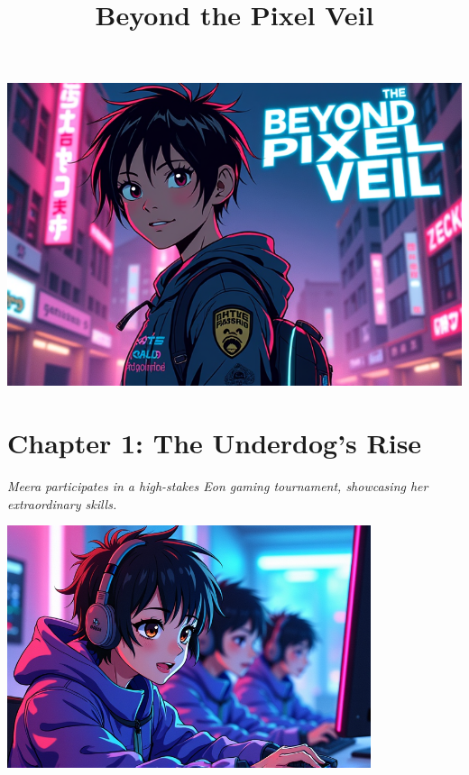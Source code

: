 \documentclass[12pt]{book}
\begin{document}
    \onehalfspacing
    \begin{center}
\includegraphics[width=\textwidth]{stories/my_story/step_6/scenes/title.png}
\end{center}
\newpage

\title{Beyond the Pixel Veil}
\maketitle

\chapter*{Chapter 1: The Underdog's Rise}
\textit{Meera participates in a high-stakes Eon gaming tournament, showcasing her extraordinary skills.}

\begin{center}
\includegraphics[width=0.8\textwidth]{stories/my_story/step_6/scenes/gaming_tournament.live.png}
\end{center}
\end{document}
